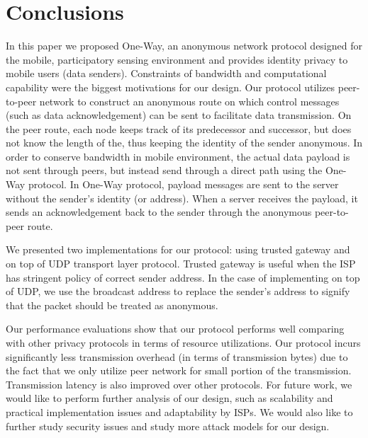 \section{Conclusions}\label{sec-conc}

In this paper we proposed One-Way, an anonymous network protocol designed
for the mobile, participatory sensing environment and provides identity
privacy to mobile users (data senders). Constraints of bandwidth and
computational capability were the biggest motivations for our design.
Our protocol utilizes peer-to-peer network to construct an anonymous
route on which control messages (such as data acknowledgement) can be sent
to facilitate data transmission. On the peer route, each node keeps track
of its predecessor and successor, but does not know the length of the,
thus keeping the identity of the sender anonymous. In order to conserve
bandwidth in mobile environment, the actual data payload is not sent
through peers, but instead send through a direct path using the One-Way
protocol. In One-Way protocol, payload messages are sent to the server
without the sender's identity (or address). When a server receives the
payload, it sends an acknowledgement back to the sender through the
anonymous peer-to-peer route.

We presented two implementations for our protocol: using trusted gateway
and on top of UDP transport layer protocol. Trusted gateway is useful
when the ISP has stringent policy of correct sender address. In the case
of implementing on top of UDP, we use the broadcast address to replace
the sender's address to signify that the packet should be treated as
anonymous.

Our performance evaluations show that our protocol performs well comparing
with other privacy protocols in terms of resource utilizations.
Our protocol incurs significantly less transmission overhead (in
terms of transmission bytes) due to the fact that we only utilize peer
network for small portion of the transmission. Transmission latency is
also improved over other protocols. For future work, we would like to
perform further analysis of our design, such as scalability and practical
implementation issues and adaptability by ISPs. We would also like to
further study security issues and study more attack models for our design.